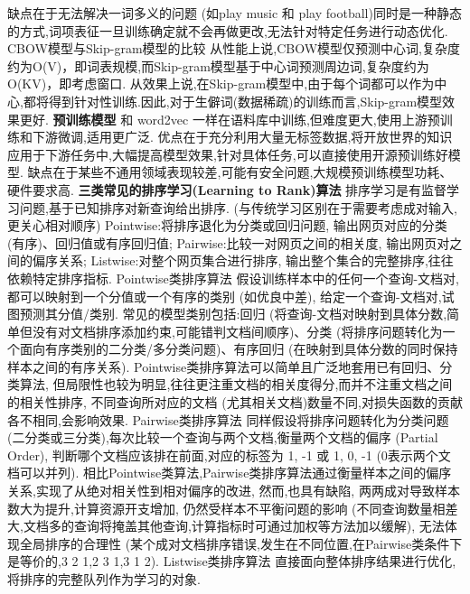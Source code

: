 \documentclass[10pt, utf8]{ctexart}
\begin{document}
\begin{multicols}{4}
    缺点在于无法解决一词多义的问题 (如play music 和 play football)同时是一种静态的方式,词项表征一旦训练确定就不会再做更改,无法针对特定任务进行动态优化.
    {\color{blue}CBOW模型与Skip-gram模型的比较}
    从性能上说,CBOW模型仅预测中心词,复杂度约为O(V)，即词表规模,而Skip-gram模型基于中心词预测周边词,复杂度约为O(KV)，即考虑窗口.
    从效果上说,在Skip-gram模型中,由于每个词都可以作为中心,都将得到针对性训练.因此,对于生僻词(数据稀疏)的训练而言,Skip-gram模型效果更好.
    {\color{purple_}\textbf{预训练模型}}
    和 word2vec 一样在语料库中训练,但难度更大,使用上游预训练和下游微调,适用更广泛.
    优点在于充分利用大量无标签数据,将开放世界的知识应用于下游任务中,大幅提高模型效果,针对具体任务,可以直接使用开源预训练好模型.
    缺点在于某些不通用领域表现较差,可能有安全问题,大规模预训练模型功耗、硬件要求高.
    {\color{purple_}\textbf{三类常见的排序学习(Learning to Rank)算法}}
    排序学习是有监督学习问题,基于已知排序对新查询给出排序. (与传统学习区别在于需要考虑成对输入,更关心相对顺序)
    Pointwise:将排序退化为分类或回归问题, 输出网页对应的分类 (有序)、回归值或有序回归值;
    Pairwise:比较一对网页之间的相关度, 输出网页对之间的偏序关系;
    Listwise:对整个网页集合进行排序, 输出整个集合的完整排序,往往依赖特定排序指标.
    {\color{blue}Pointwise类排序算法}
    假设训练样本中的任何一个查询-文档对,都可以映射到一个分值或一个有序的类别 (如优良中差),
    给定一个查询-文档对,试图预测其分值/类别.
    常见的模型类别包括:回归 (将查询-文档对映射到具体分数,简单但没有对文档排序添加约束,可能错判文档间顺序)、分类 (将排序问题转化为一个面向有序类别的二分类/多分类问题)、有序回归 (在映射到具体分数的同时保持样本之间的有序关系).
    Pointwise类排序算法可以简单且广泛地套用已有回归、分类算法,
    但局限性也较为明显,往往更注重文档的相关度得分,而并不注重文档之间的相关性排序,
    不同查询所对应的文档 (尤其相关文档)数量不同,对损失函数的贡献各不相同,会影响效果.
    {\color{blue}Pairwise类排序算法}
    同样假设将排序问题转化为分类问题 (二分类或三分类),每次比较一个查询与两个文档,衡量两个文档的偏序 (Partial Order),
    判断哪个文档应该排在前面,对应的标签为 {1, -1} 或 {1, 0, -1} (0表示两个文档可以并列).
    相比Pointwise类算法,Pairwise类排序算法通过衡量样本之间的偏序
    关系,实现了从绝对相关性到相对偏序的改进,
    然而,也具有缺陷,
    两两成对导致样本数大为提升,计算资源开支增加,
    仍然受样本不平衡问题的影响 (不同查询数量相差大,文档多的查询将掩盖其他查询,计算指标时可通过加权等方法加以缓解),
    无法体现全局排序的合理性 (某个成对文档排序错误,发生在不同位置,在Pairwise类条件下是等价的,3 2 1,2 3 1,3 1 2).
        {\color{blue}Listwise类排序算法}
    直接面向整体排序结果进行优化,将排序的完整队列作为学习的对象.

\end{multicols}
\end{document}
